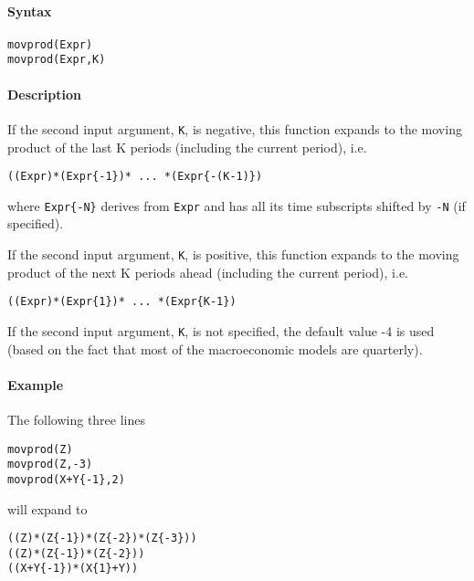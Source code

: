 


	\paragraph{Syntax}\label{syntax}

\begin{verbatim}
movprod(Expr)
movprod(Expr,K)
\end{verbatim}

\paragraph{Description}\label{description}

If the second input argument, \texttt{K}, is negative, this function
expands to the moving product of the last K periods (including the
current period), i.e.

\begin{verbatim}
((Expr)*(Expr{-1})* ... *(Expr{-(K-1)})
\end{verbatim}

where \texttt{Expr\{-N\}} derives from \texttt{Expr} and has all its
time subscripts shifted by \texttt{-N} (if specified).

If the second input argument, \texttt{K}, is positive, this function
expands to the moving product of the next K periods ahead (including the
current period), i.e.

\begin{verbatim}
((Expr)*(Expr{1})* ... *(Expr{K-1})
\end{verbatim}

If the second input argument, \texttt{K}, is not specified, the default
value -4 is used (based on the fact that most of the macroeconomic
models are quarterly).

\paragraph{Example}\label{example}

The following three lines

\begin{verbatim}
movprod(Z)
movprod(Z,-3)
movprod(X+Y{-1},2)
\end{verbatim}

will expand to

\begin{verbatim}
((Z)*(Z{-1})*(Z{-2})*(Z{-3}))
((Z)*(Z{-1})*(Z{-2}))
((X+Y{-1})*(X{1}+Y))
\end{verbatim}


